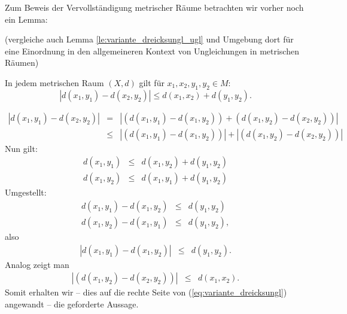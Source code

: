 \documentclass[10pt]{scrbook}
\begin{document}
Zum Beweis der Vervollständigung metrischer Räume betrachten wir vorher noch ein Lemma:
\begin{Le}
\label{le:variante_dreicksungl} (vergleiche auch Lemma \ref{le:variante_dreicksungl_ugl} und Umgebung dort für eine Einordnung in den allgemeineren Kontext von Ungleichungen in metrischen Räumen)

In jedem metrischen Raum $(X, d)$ gilt für $x_1, x_2, y_1, y_2\in M$:
\begin{equation}
	\left|d(x_1, y_1)-d(x_2, y_2)\right|\leq d(x_1, x_2)+d(y_1, y_2).
\end{equation}
\end{Le}
\begin{bew}
\begin{eqnarray}
|d(x_1, y_1)-d(x_2, y_2)| & = & \left|(d(x_1, y_1)-d(x_1, y_2))+(d(x_1, y_2)-d(x_2, y_2))\right| \nonumber \\
& \leq & \left|(d(x_1, y_1)-d(x_1, y_2))\right|+\left|(d(x_1, y_2)-d(x_2, y_2))\right| \label{eq:variante_dreicksungl}
\end{eqnarray}
Nun gilt:
\begin{eqnarray*}
d(x_1, y_1) & \leq & d(x_1, y_2)+d(y_1, y_2) \\
d(x_1, y_2) & \leq & d(x_1, y_1)+d(y_1, y_2)
\end{eqnarray*}
Umgestellt:
\begin{eqnarray*}
d(x_1, y_1)-d(x_1, y_2) & \leq & d(y_1, y_2) \\
d(x_1, y_2)-d(x_1, y_1) & \leq & d(y_1, y_2),
\end{eqnarray*}
also
\begin{eqnarray*}
\left|d(x_1, y_1)-d(x_1, y_2)\right| & \leq & d(y_1, y_2).
\end{eqnarray*}
Analog zeigt man
\begin{eqnarray*}
\left|(d(x_1, y_2)-d(x_2, y_2))\right| & \leq & d(x_1, x_2).
\end{eqnarray*}
Somit erhalten wir -- dies auf die rechte Seite von (\ref{eq:variante_dreicksungl}) angewandt -- die geforderte Aussage.
\end{bew}
\end{document}
